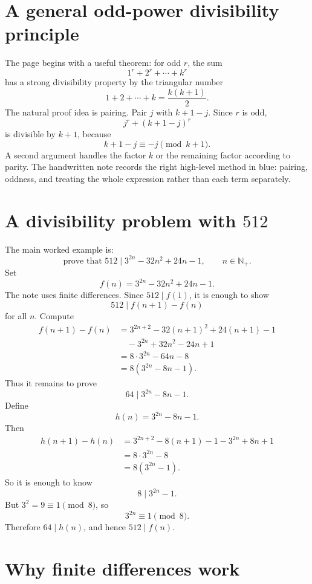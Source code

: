 
\section{A general odd-power divisibility principle}

The page begins with a useful theorem: for odd \(r\), the sum
\[
  1^r+2^r+\cdots+k^r
\]
has a strong divisibility property by the triangular number
\[
  1+2+\cdots+k=\frac{k(k+1)}2.
\]
The natural proof idea is pairing.  Pair \(j\) with \(k+1-j\).  Since \(r\) is odd,
\[
  j^r+(k+1-j)^r
\]
is divisible by \(k+1\), because
\[
  k+1-j\equiv -j\pmod{k+1}.
\]
A second argument handles the factor \(k\) or the remaining factor according to parity.  The handwritten note records the right high-level method in blue: pairing, oddness, and treating the whole expression rather than each term separately.

\section[A divisibility problem with 512]{A divisibility problem with \(512\)}

The main worked example is:
\[
  \text{prove that }512\mid 3^{2n}-32n^2+24n-1,\qquad n\in\mathbb N_+.
\]
Set
\[
  f(n)=3^{2n}-32n^2+24n-1.
\]
The note uses finite differences.  Since \(512\mid f(1)\), it is enough to show
\[
  512\mid f(n+1)-f(n)
\]
for all \(n\).  Compute
\[
\begin{aligned}
 f(n+1)-f(n)
 &=3^{2n+2}-32(n+1)^2+24(n+1)-1\\
 &\quad -3^{2n}+32n^2-24n+1\\
 &=8\cdot3^{2n}-64n-8\\
 &=8(3^{2n}-8n-1).
\end{aligned}
\]
Thus it remains to prove
\[
  64\mid 3^{2n}-8n-1.
\]
Define
\[
  h(n)=3^{2n}-8n-1.
\]
Then
\[
\begin{aligned}
 h(n+1)-h(n)
 &=3^{2n+2}-8(n+1)-1-3^{2n}+8n+1\\
 &=8\cdot3^{2n}-8\\
 &=8(3^{2n}-1).
\end{aligned}
\]
So it is enough to know
\[
  8\mid 3^{2n}-1.
\]
But \(3^2=9\equiv1\pmod8\), so
\[
  3^{2n}\equiv1\pmod8.
\]
Therefore \(64\mid h(n)\), and hence \(512\mid f(n)\).

\section{Why finite differences work}

